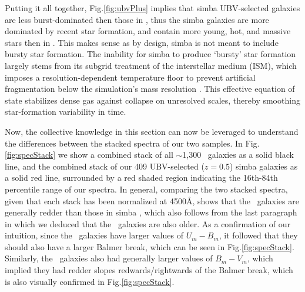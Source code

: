 \documentclass[twocolumn, linenumbers]{aastex631}
\renewcommand{\fig}{Fig.\hspace{.2em}}
\newcommand{\simba}[0]{{\sc simba} }
\begin{document}
Putting it all together, \fig\ref{fig:ubvPlus} implies that \simba UBV-selected galaxies are less burst-dominated then those in \squig, thus the \simba galaxies are more dominated by recent star formation, and contain more young, hot, and massive stars then in \squig.  This makes sense as by design, \simba is not meant to include bursty star formation.  The inability for \simba to produce `bursty' star formation largely stems from its subgrid treatment of the interstellar medium (ISM), which imposes a resolution-dependent temperature floor to prevent artificial fragmentation below the simulation’s mass resolution \citep{Springel03, mufasa, simba}. This effective equation of state stabilizes dense gas against collapse on unresolved scales, thereby smoothing star-formation variability in time.  

Now, the collective knowledge in this section can now be leveraged to understand the differences between the stacked spectra of our two samples.  In \fig\ref{fig:specStack} we show a combined stack of all $\sim$1,300 \squig\ galaxies as a solid black line, and the combined stack of our 409 UBV-selected ($z=0.5$) \simba galaxies as a solid red line, surrounded by a red shaded region indicating the 16th-84th percentile range of our spectra.  In general, comparing the two stacked spectra, given that each stack has been normalized at 4500\r{A}, shows that the \squig\ galaxies are generally redder than those in \simba\!\!, which also follows from the last paragraph in which we deduced that the \squig\ galaxies are also older.  As a confirmation of our intuition, since the \squig\ galaxies have larger values of $U_m-B_m$, it followed that they should also have a larger Balmer break, which can be seen in \fig\ref{fig:specStack}.  Similarly, the \squig\ galaxies also had generally larger values of $B_m-V_m$, which implied they had redder slopes redwards/rightwards of the Balmer break, which is also visually confirmed in \fig\ref{fig:specStack}.
\end{document}
